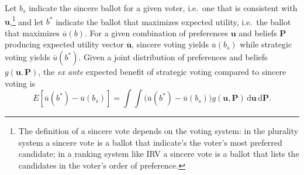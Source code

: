 \documentclass[11pt,a4paper]{article}
\begin{document}
Let $b_s$ indicate the sincere ballot for a given voter, i.e.\ one that is consistent with $\mathbf{u}$,\footnote{The definition of a sincere vote depends on the voting system: in the plurality system a sincere vote is a ballot that indicate's the voter's most preferred candidate; in a ranking system like IRV a sincere vote is a ballot that lists the candidates in the voter's order of preference.} and let $b^*$ indicate the ballot that maximizes expected utility, i.e.\ the ballot that maximizes $\overline{u}(b)$. For a given combination of preferences $\mathbf{u}$ and beliefs $\mathbf{P}$ producing expected utility vector $\overline{\mathbf{u}}$, sincere voting %
yields $\overline{u}(b_s)$ while strategic voting yields $\overline{u}(b^*)$. 
Given a joint distribution of preferences and beliefs $g(\mathbf{u}, \mathbf{P})$, the \emph{ex ante} expected benefit of strategic voting compared to sincere voting is 
\[
E\left[\overline{u}(b^*) - \overline{u}(b_s)\right] = %
\int \int \big( \overline{u}(b^*) - \overline{u}(b_s) \big) g(\mathbf{u}, \mathbf{P}) \, \mathrm{d} \mathbf{u}\, \mathrm{d} \mathbf{P}. 
\]

\end{document}
